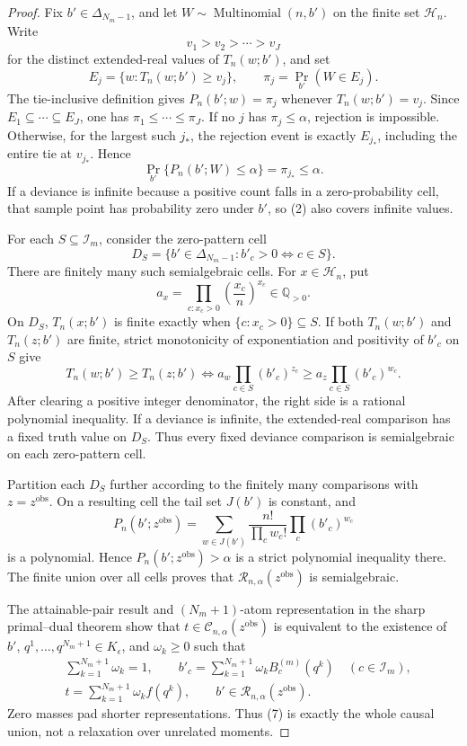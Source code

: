 \documentclass{article}
\begin{document}
\begin{proof}
Fix \(b'\in\Delta_{N_m-1}\), and let \(W\sim\operatorname{Multinomial}(n,b')\) on the finite set \(\mathcal H_n\).  Write
\[
 v_1>v_2>\cdots>v_J
\]
for the distinct extended-real values of \(T_n(w;b')\), and set
\[
 E_j=\{w:T_n(w;b')\geq v_j\},
 \qquad \pi_j=\Pr_{b'}(W\in E_j).
\tag{1}
\]
The tie-inclusive definition gives \(P_n(b';w)=\pi_j\) whenever \(T_n(w;b')=v_j\).  Since \(E_1\subseteq\cdots\subseteq E_J\), one has \(\pi_1\leq\cdots\leq\pi_J\).  If no \(j\) has \(\pi_j\leq\alpha\), rejection is impossible.  Otherwise, for the largest such \(j_*\), the rejection event is exactly \(E_{j_*}\), including the entire tie at \(v_{j_*}\).  Hence
\[
 \Pr_{b'}\{P_n(b';W)\leq\alpha\}
 =\pi_{j_*}\leq\alpha.
\tag{2}
\]
If a deviance is infinite because a positive count falls in a zero-probability cell, that sample point has probability zero under \(b'\), so (2) also covers infinite values.

For each \(S\subseteq\mathcal I_m\), consider the zero-pattern cell
\[
 D_S=\{b'\in\Delta_{N_m-1}:b'_c>0\Longleftrightarrow c\in S\}.
\tag{3}
\]
There are finitely many such semialgebraic cells.  For \(x\in\mathcal H_n\), put
\[
 a_x=\prod_{c:x_c>0}\left(\frac{x_c}{n}\right)^{x_c}\in\mathbb Q_{>0}.
\tag{4}
\]
On \(D_S\), \(T_n(x;b')\) is finite exactly when \(\{c:x_c>0\}\subseteq S\).  If both \(T_n(w;b')\) and \(T_n(z;b')\) are finite, strict monotonicity of exponentiation and positivity of \(b'_c\) on \(S\) give
\[
 T_n(w;b')\geq T_n(z;b')
 \Longleftrightarrow
 a_w\prod_{c\in S}(b'_c)^{z_c}
 \geq a_z\prod_{c\in S}(b'_c)^{w_c}.
\tag{5}
\]
After clearing a positive integer denominator, the right side is a rational polynomial inequality.  If a deviance is infinite, the extended-real comparison has a fixed truth value on \(D_S\).  Thus every fixed deviance comparison is semialgebraic on each zero-pattern cell.

Partition each \(D_S\) further according to the finitely many comparisons with \(z=z^{\mathrm{obs}}\).  On a resulting cell the tail set \(J(b')\) is constant, and
\[
 P_n(b';z^{\mathrm{obs}})
 =\sum_{w\in J(b')}\frac{n!}{\prod_cw_c!}\prod_c(b'_c)^{w_c}
\tag{6}
\]
is a polynomial.  Hence \(P_n(b';z^{\mathrm{obs}})>\alpha\) is a strict polynomial inequality there.  The finite union over all cells proves that \(\mathcal R_{n,\alpha}(z^{\mathrm{obs}})\) is semialgebraic.

The attainable-pair result and \((N_m+1)\)-atom representation in the sharp primal--dual theorem show that \(t\in\mathcal C_{n,\alpha}(z^{\mathrm{obs}})\) is equivalent to the existence of \(b'\), \(q^1,\ldots,q^{N_m+1}\in K_{\epsilon}\), and \(\omega_k\geq0\) such that
\[
 \begin{split}
 &\sum_{k=1}^{N_m+1}\omega_k=1,
 \qquad b'_c=\sum_{k=1}^{N_m+1}\omega_kB_c^{(m)}(q^k)
 \quad(c\in\mathcal I_m),\\
 &t=\sum_{k=1}^{N_m+1}\omega_kf(q^k),
 \qquad b'\in\mathcal R_{n,\alpha}(z^{\mathrm{obs}}).
 \end{split}
\tag{7}
\]
Zero masses pad shorter representations.  Thus (7) is exactly the whole causal union, not a relaxation over unrelated moments.


\end{proof}
\end{document}
